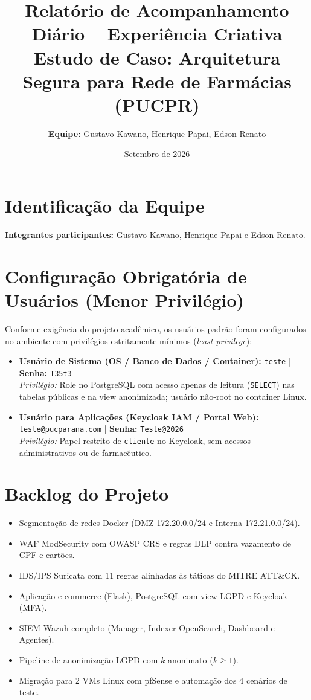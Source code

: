 \documentclass[11pt,a4paper]{article}
\title{\textbf{Relatório de Acompanhamento Diário -- Experiência Criativa}\\
\large Estudo de Caso: Arquitetura Segura para Rede de Farmácias (PUCPR)}
\author{\textbf{Equipe:} Gustavo Kawano, Henrique Papai, Edson Renato}
\date{Setembro de 2026}
\begin{document}
\maketitle

\section{Identificação da Equipe}
\textbf{Integrantes participantes:} Gustavo Kawano, Henrique Papai e Edson Renato.

\section{Configuração Obrigatória de Usuários (Menor Privilégio)}
Conforme exigência do projeto acadêmico, os usuários padrão foram configurados no ambiente com privilégios estritamente mínimos (\textit{least privilege}):
\begin{itemize}[noitemsep]
    \item \textbf{Usuário de Sistema (OS / Banco de Dados / Container):} \texttt{teste} | \textbf{Senha:} \texttt{T35t3} \\
    \textit{Privilégio:} Role no PostgreSQL com acesso apenas de leitura (\texttt{SELECT}) nas tabelas públicas e na view anonimizada; usuário não-root no container Linux.
    \item \textbf{Usuário para Aplicações (Keycloak IAM / Portal Web):} \texttt{teste@pucparana.com} | \textbf{Senha:} \texttt{Teste@2026} \\
    \textit{Privilégio:} Papel restrito de \texttt{cliente} no Keycloak, sem acessos administrativos ou de farmacêutico.
\end{itemize}

\section{Backlog do Projeto}
\begin{itemize}[noitemsep]
    \item Segmentação de redes Docker (DMZ 172.20.0.0/24 e Interna 172.21.0.0/24).
    \item WAF ModSecurity com OWASP CRS e regras DLP contra vazamento de CPF e cartões.
    \item IDS/IPS Suricata com 11 regras alinhadas às táticas do MITRE ATT\&CK.
    \item Aplicação e-commerce (Flask), PostgreSQL com view LGPD e Keycloak (MFA).
    \item SIEM Wazuh completo (Manager, Indexer OpenSearch, Dashboard e Agentes).
    \item Pipeline de anonimização LGPD com $k$-anonimato ($k \ge 1$).
    \item Migração para 2 VMs Linux com pfSense e automação dos 4 cenários de teste.
\end{itemize}
\end{document}
